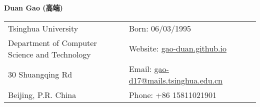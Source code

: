 \documentclass[letterpaper,11pt,oneside]{article}
\begin{document}

\noindent  \LARGE{\textbf{Duan Gao (高端)}}  \\
\vspace{-2ex}
\hrulefill  
\normalsize


\begin{center}
\begin{tabular}{l l l}
 Tsinghua University    &  \hspace{0.5in} Born: 06/03/1995 \\
 
  Department of Computer Science and Technology    & \hspace{0.5in} Website: \href{gao-duan.github.io}{gao-duan.github.io}   \\
   
   30 Shuangqing Rd &  \hspace{0.5in} Email: \href{mailto:gao-d17@mails.tsinghua.edu.cn}{gao-d17@mails.tsinghua.edu.cn} \\
    Beijing, P.R. China  & \hspace{0.5in} Phone: +86 15811021901 \\

\end{tabular}
\end{center}

\vspace{1em}

\end{document}
